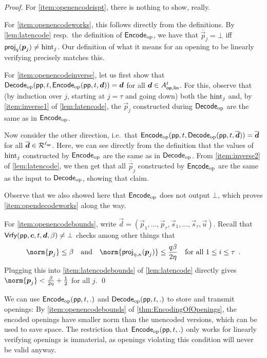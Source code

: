 \begin{proof}
For \autoref{item:openencodeispt}, there is nothing to show, really.

\bigskip\noindent
For \autoref{item:openencodeworks}, this follows directly from the definitions.
By \autoref{lem:latencode} resp.\ the definition of $\mathsf{Encode}_{\mathrm{op}}$, we have that $\overline{\vec{p}}_j = \bot$ iff $\mathsf{proj}_{q}(\boldsymbol{p}_j) \neq \mathrm{hint}_j$.
Our definition of what it means for an opening to be linearly verifying precisely matches this.

\bigskip\noindent
For \autoref{item:openencodeinverse}, let us first show that $\mathsf{Decode}_{\mathrm{op}}(\mathsf{pp}, t, \mathsf{Encode}_{\mathrm{op}}(\mathsf{pp},t, \boldsymbol{d})) = \boldsymbol{d}$ for all $\boldsymbol{d}\in A_{\mathsf{op,lin}}^{t}$.
For this, observe that (by induction over $j$, starting at $j=\tau$ and going down) both the $\mathrm{hint}_j$ and, by \autoref{item:inverse1} of \autoref{lem:latencode}, the $\vec{p}_j$ constructed during $\mathsf{Decode}_{\mathrm{op}}$ are the same as in $\mathsf{Encode}_{\mathrm{op}}$.

Now consider the other direction, i.e.\ that $\mathsf{Encode}_{\mathrm{op}}(\mathsf{pp}, t,\mathsf{Decode}_{\mathrm{op}}(\mathsf{pp},t,\overline{\boldsymbol{d}})) = \overline{\boldsymbol{d}}$ for all $\overline{\boldsymbol{d}}\in\mathcal{R}^{{\ell_{\mathsf{op}}}}$.
Here, we can see directly from the definition that the values of $\mathrm{hint}_j$ constructed by $\mathsf{Encode}_{\mathrm{op}}$ are the same as in $\mathsf{Decode}_{\mathrm{op}}$.
From \autoref{item:inverse2} of \autoref{lem:latencode}, we then get that all $\overline{\vec{p}}_j$ constructed by $\mathsf{Encode}_{\mathrm{op}}$ are the same as the input to $\mathsf{Decode}_{\mathrm{op}}$, showing that claim.

Observe that we also showed here that $\mathsf{Encode}_{\mathrm{op}}$ does not output $\bot$, which proves \autoref{item:opendecodeworks} along the way.

\bigskip\noindent
For \autoref{item:openencodebounds}, write $\vec{d} = (\vec{p}_1,\ldots,\vec{p}_\tau,\vec{s}_1,\ldots, \vec{s}_\tau,\vec{u})$.
Recall that $\mathsf{Vrfy}(\mathsf{pp}, \boldsymbol{c},t,\boldsymbol{d},\beta) \neq \bot$ checks among other things that
\[
 \norm{\vec{p}_j} \leq \beta \quad\text{and}\quad \norm{\projring(\vec{p}_j)}\leq \frac{q\beta}{2\eta} \quad\text{for all $1\leq i \leq \tau$}\enspace.
\]
Plugging this into \autoref{item:latencodebounds} of \autoref{lem:latencode} directly gives $\norm{\vec{p}_j} < \frac{\beta}{2\eta}+\frac12$ for all $j$.
\qed
\end{proof}

We can use $\mathsf{Encode}_{\mathrm{op}}(\mathsf{pp}, t, .)$ and $\mathsf{Decode}_{\mathrm{op}}(\mathsf{pp}, t, .)$ to store and transmit openings:
By \autoref{item:openencodebounds} of \autoref{thm:EncodingOfOpenings}, the encoded openings have smaller norm than the unencoded versions, which can be used to save space.
The restriction that $\mathsf{Encode}_{\mathrm{op}}(\mathsf{pp}, t, .)$ only works for linearly verifying openings is immaterial, as openings violating this condition will never be valid anyway.

